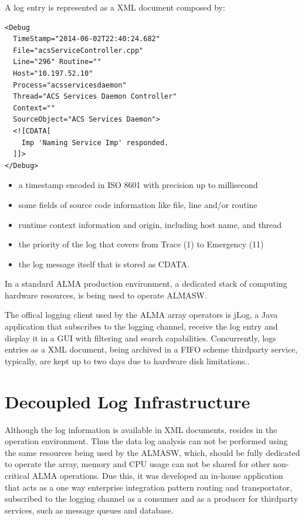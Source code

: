 \documentclass[]{spie}  %
\begin{document}
A log entry is represented as a XML document composed by: 

{\small
\begin{verbatim}
<Debug 
  TimeStamp="2014-06-02T22:40:24.682" 
  File="acsServiceController.cpp" 
  Line="296" Routine="" 
  Host="10.197.52.10" 
  Process="acsservicesdaemon" 
  Thread="ACS Services Daemon Controller" 
  Context="" 
  SourceObject="ACS Services Daemon">
  <![CDATA[
    Imp 'Naming Service Imp' responded.
  ]]>
</Debug>
\end{verbatim}
}

\begin{itemize}
\item a timestamp encoded in ISO 8601 with precision up to millisecond
\item some fields of source code information like file, line and/or routine
\item runtime context information and origin, including host name, and thread
\item the priority of the log that covers from Trace (1) to Emergency (11)
\item the log message itself that is stored as CDATA\cite{avarias2010introducing}.
\end{itemize}

In a standard ALMA production environment, a dedicated stack of computing 
hardware resources, is being used to operate ALMASW. 


The offical logging client used by the ALMA array operators is
jLog, a Java application that subscribes to the logging channel, receive the log 
entry and display it in a GUI with filtering and search capabilities. 
Concurrently, logs entries as a XML document, being archived in a FIFO scheme 
thirdparty service, typically, are kept up to two days due to hardware disk limitations.\cite{shen2012alma}.

\section{Decoupled Log Infrastructure}
Although the log information is available in XML documents, resides in the 
operation environment. Thus the data log analysis can not be performed using the 
same resources being used by the ALMASW, which, should be fully dedicated to 
operate the array, memory and CPU usage can not be shared for other non-critical 
ALMA operations. Due this, it was developed an in-house application that acts as 
a one way enterprise integration pattern routing and transportator, subscribed 
to the logging channel as a consumer and as a producer for thirdparty services, 
such as message queues and database.
\end{document}
